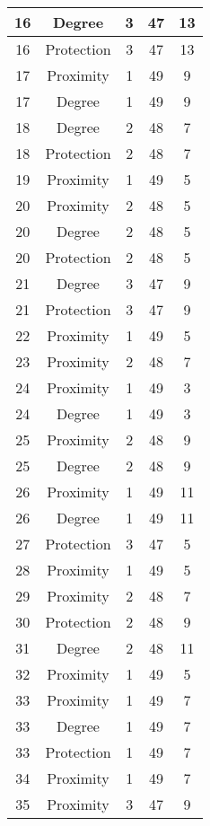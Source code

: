 \documentclass[results.tex]{subfiles}
\begin{document}
\begin{center}
\begin{tabular}{| c || c | c | c | c |}
    16 & Degree & 3 & 47 & 13 \\ 
    \hline
    16 & Protection & 3 & 47 & 13 \\ 
    \hline
    17 & Proximity & 1 & 49 & 9 \\ 
    \hline
    17 & Degree & 1 & 49 & 9 \\ 
    \hline
    18 & Degree & 2 & 48 & 7 \\ 
    \hline
    18 & Protection & 2 & 48 & 7 \\ 
    \hline
    19 & Proximity & 1 & 49 & 5 \\ 
    \hline
    20 & Proximity & 2 & 48 & 5 \\ 
    \hline
    20 & Degree & 2 & 48 & 5 \\ 
    \hline
    20 & Protection & 2 & 48 & 5 \\ 
    \hline
    21 & Degree & 3 & 47 & 9 \\ 
    \hline
    21 & Protection & 3 & 47 & 9 \\ 
    \hline
    22 & Proximity & 1 & 49 & 5 \\ 
    \hline
    23 & Proximity & 2 & 48 & 7 \\ 
    \hline
    24 & Proximity & 1 & 49 & 3 \\ 
    \hline
    24 & Degree & 1 & 49 & 3 \\ 
    \hline
    25 & Proximity & 2 & 48 & 9 \\ 
    \hline
    25 & Degree & 2 & 48 & 9 \\ 
    \hline
    26 & Proximity & 1 & 49 & 11 \\ 
    \hline
    26 & Degree & 1 & 49 & 11 \\ 
    \hline
    27 & Protection & 3 & 47 & 5 \\ 
    \hline
    28 & Proximity & 1 & 49 & 5 \\ 
    \hline
    29 & Proximity & 2 & 48 & 7 \\ 
    \hline
    30 & Protection & 2 & 48 & 9 \\ 
    \hline
    31 & Degree & 2 & 48 & 11 \\ 
    \hline
    32 & Proximity & 1 & 49 & 5 \\ 
    \hline
    33 & Proximity & 1 & 49 & 7 \\ 
    \hline
    33 & Degree & 1 & 49 & 7 \\ 
    \hline
    33 & Protection & 1 & 49 & 7 \\ 
    \hline
    34 & Proximity & 1 & 49 & 7 \\ 
    \hline
    35 & Proximity & 3 & 47 & 9 \\ 

\end{tabular}
\end{center}
\end{document}
